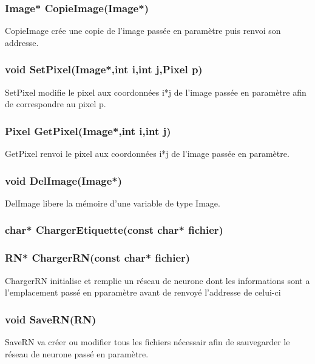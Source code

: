 \documentclass{article}
\begin{document}
		\subsubsection{\textcolor{myblue}{\textbf{Image*}} CopieImage(\textcolor{myblue}{\textbf{Image*}})}
		CopieImage crée une copie de l'image passée en paramètre puis renvoi son addresse.
		
		\subsubsection{\textcolor{myblue}{\textbf{void}} SetPixel(\textcolor{myblue}{\textbf{Image*}},\textcolor{myblue}{\textbf{int}} i,\textcolor{myblue}{\textbf{int}} j,Pixel p)}
			SetPixel modifie le pixel aux coordonnées i*j de l'image passée en paramètre afin de correspondre au pixel p.
		
		\subsubsection{\textcolor{myblue}{\textbf{Pixel}} GetPixel(\textcolor{myblue}{\textbf{Image*}},\textcolor{myblue}{\textbf{int}} i,\textcolor{myblue}{\textbf{int}} j)}
		GetPixel renvoi le pixel aux coordonnées i*j de l'image passée en paramètre.
		
		\subsubsection{\textcolor{myblue}{\textbf{void}} DelImage(Image*)}
		DelImage libere la mémoire d'une variable de type Image.
		
		\subsubsection{\textcolor{myblue}{\textbf{char*}} ChargerEtiquette(\textcolor{myblue}{\textbf{const char*}} fichier)}
		
		
		\subsubsection{\textcolor{myblue}{\textbf{RN*}} ChargerRN(\textcolor{myblue}{\textbf{const char*}} fichier)}
		ChargerRN initialise et remplie un réseau de neurone dont les informations sont a l'emplacement passé en pparamètre avant de renvoyé l'addresse de celui-ci
		
		\subsubsection{\textcolor{myblue}{\textbf{void}} SaveRN(\textcolor{myblue}{\textbf{RN}})}
		SaveRN va créer ou modifier tous les fichiers nécessair afin de sauvegarder le réseau de neurone passé en paramètre.
		
\end{document}
